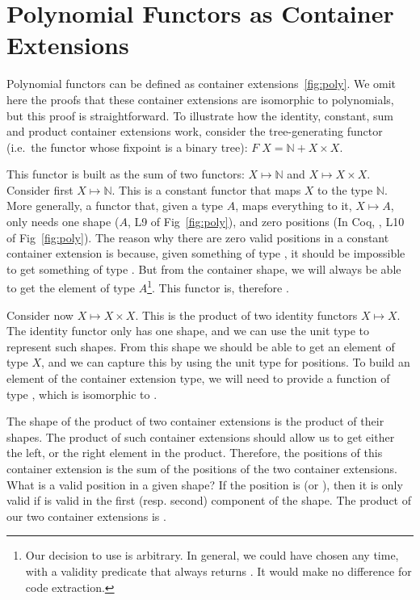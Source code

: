 \documentclass[ a4paper, UKenglish, cleveref, autoref, thm-restate]{lipics-v2021}
\begin{document}

\appendix
\section{Polynomial Functors as Container Extensions}
\label{sec:pol-containers}
Polynomial functors can be defined as container extensions~\ref{fig:poly}. We
omit here the proofs that these container extensions are isomorphic to
polynomials, but this proof is straightforward. To illustrate how the identity,
constant, sum and product container extensions work, consider the
tree-generating functor (i.e.\ the functor whose fixpoint is a binary tree):
$F\; X = \mathbb{N} + X \times X$.

This functor is built as the sum of two functors: $X \mapsto \mathbb{N}$ and $X \mapsto
X \times X$. Consider first $X \mapsto \mathbb{N}$. This is a constant functor
that maps $X$ to the type $\mathbb{N}$. More generally, a functor that, given a
type $A$, maps everything to it, $X \mapsto A$, only needs one shape ($A$, L9
of Fig~\ref{fig:poly}), and zero positions (In Coq, ,
L10 of Fig~\ref{fig:poly}). The reason why there are zero valid positions in
a constant container extension is because, given something of type
, it should be impossible to get
something of type . But from the container shape, we will
always be able to get the element of type $A$\footnote{%
  Our decision to use  is arbitrary. In general, we
  could have chosen any time, with a validity predicate that always returns
  . It would make no difference for code extraction.
}. This functor is, therefore .

Consider now $X \mapsto X \times X$. This is the product of two
identity functors $X \mapsto X$. The identity functor only has one shape, and
we can use the unit type to represent such shapes. From this shape we should be
able to get an element of type $X$, and we can capture this by using the unit
type for positions. To build an element of the container extension type, we
will need to provide a function of type , which is
isomorphic to .

The shape of the product of two container extensions is the product of their
shapes. The product of such container extensions should allow us to get either
the left, or the right element in the product. Therefore, the positions of this
container extension is the sum of the positions of the two container
extensions. What is a valid position in a given shape? If the position is
 (or ), then it is only valid if
 is valid in the first (resp. second) component of the
shape. The product of our two container extensions is
.
\end{document}
